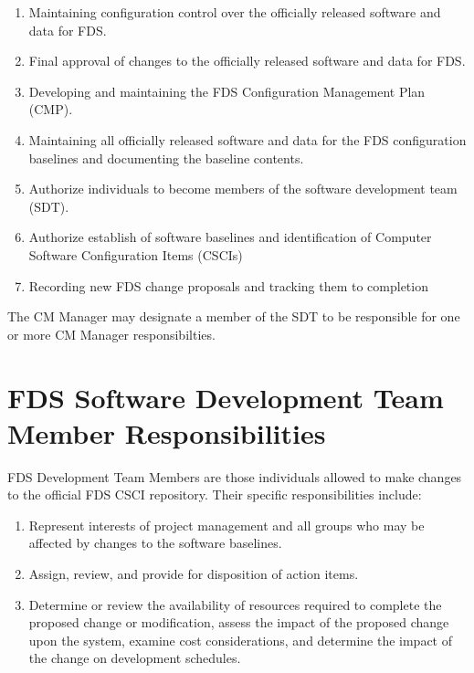 \documentclass[11pt]{book}
\begin{document}
\begin{enumerate}

\item Maintaining configuration control over the officially released software and data for FDS.

\item Final approval of changes to the officially released software and data for FDS.

\item Developing and maintaining the FDS Configuration Management Plan (CMP).

\item Maintaining all officially released software and data for the FDS configuration baselines and documenting
the baseline contents.

\item Authorize individuals to become members of the software development team (SDT).

\item Authorize establish of software baselines and identification of Computer Software Configuration Items (CSCIs)

\item Recording new FDS change proposals and tracking them to completion

\end{enumerate}

The CM Manager may designate a member of the SDT to be responsible for one or more CM Manager responsibilties.

\section{FDS Software Development Team Member Responsibilities}

FDS Development Team Members are those individuals allowed to make changes to the official FDS CSCI repository.
Their specific responsibilities include:

\begin{enumerate}

\item Represent interests of project management and all groups who may be affected by changes
to the software baselines. 

\item Assign, review, and provide for disposition of action items.

\item Determine or review the availability of resources required to complete the proposed change or
modification, assess the impact of the proposed change upon the system, examine cost considerations,
and determine the impact of the change on development schedules.

\end{enumerate}
\end{document}
